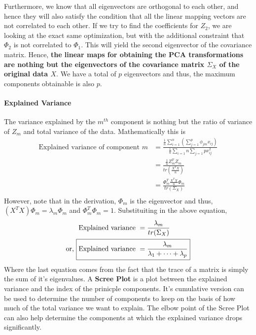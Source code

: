 \documentclass[11pt, a4paper]{article}
\begin{document}
    Furthermore, we know that all eigenvectors are orthogonal to each other, and hence they will also satisfy the condition that all the linear mapping vectors are not correlated to each other. \newline
    If we try to find the coefficients for $Z_{2}$, we are looking at the exact same optimization, but with the additional constraint that $\Phi_{2}$ is not correlated to $\Phi_{1}$. This will yield the second eigenvector of the covariance matrix. \newline
    Hence, \textbf{the linear maps for obtaining the PCA transformations are nothing but the eigenvectors of the covariance matrix $\Sigma_{X}$ of the original data $X$}. We have a total of $p$ eigenvectors and thus, the maximum components obtainable is also $p$.

    \paragraph{Explained Variance}
    The variance explained by the $m^{th}$ component is nothing but the ratio of variance of $Z_{m}$ and total variance of the data. Mathematically this is
    \begin{align*}
        \text{Explained variance of component } m &= \frac{\frac{1}{n}\sum_{i=1}^{n} (\sum_{j=1}^{p} \phi_{jm} x_{ij})}{\frac{1}{n}\sum_{i=1}{n} \sum_{j=1}{p} x_{ij}^2}\\
                &= \frac{\frac{1}{n}Z_{m}^{T}Z_{m}}{tr(\frac{X^{T}X}{n})}\\
                &= \frac{\Phi_{m}^{T}\frac{X^{T}X}{n}\Phi_{m}}{tr(\Sigma_{X})}\\
    \end{align*}
    However, note that in the derivation, $\Phi_{m}$ is the eigenvector and thus, $(X^{T}X)\Phi_{m} = \lambda_{m}\Phi_{m}$ and $\Phi_{m}^{T}\Phi_{m} = 1$. Substituiting in the above equation,
    \begin{align*}
        \text{Explained variance } &= \frac{\lambda_{m}}{tr(\Sigma_{X})}\\
        \text{or, } \Aboxed{\text{Explained variance } &= \frac{\lambda_{m}}{\lambda_{1} + \cdots +\lambda_{p}}}
    \end{align*}
    Where the last equation comes from the fact that the trace of a matrix is simply the sum of it's eigenvalues.\newline
    A \textbf{Scree Plot} is a plot between the explained variance and the index of the prinicple components. It's cumulative version can be used to determine the number of components to keep on the basis of how much of the total variance we want to explain. The elbow point of the Scree Plot can also help determine the components at which the explained variance drops significantly.
\end{document}
